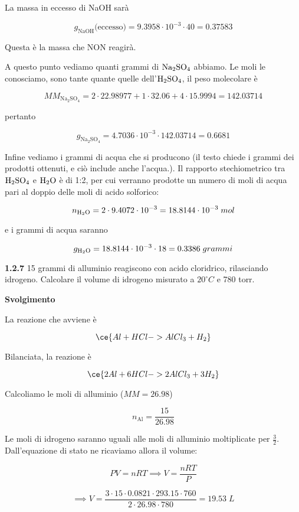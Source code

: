 La massa in eccesso di NaOH sarà

$$g_{\text{NaOH}}\text{(eccesso)}=9.3958 \cdot 10^{-3} \cdot 40=0.37583$$

Questa è la massa che NON reagirà.

A questo punto vediamo quanti grammi di $\rm Na_2SO_4$ abbiamo. Le moli le conosciamo, sono tante quante quelle dell'$\rm H_2SO_4$, il peso molecolare è

$$MM_{\text{Na}_2\text{SO}_4}=2\cdot22.98977 + 1 \cdot 32.06 + 4 \cdot 15.9994=142.03714$$

pertanto

$$g_{\text{Na}_2\text{SO}_4}
=4.7036 \cdot 10^{-3} \cdot 142.03714
=0.6681$$

Infine vediamo i grammi di acqua che si producono (il testo chiede i grammi dei prodotti ottenuti, e ciò include anche l'acqua.). Il rapporto stechiometrico tra $\rm H_2SO_4$ e $\rm H_2O$ è di 1:2, per cui verranno prodotte un numero di moli di acqua pari al doppio delle moli di acido solforico:

$$n_{\rm H_2O}= 2 \cdot 9.4072 \cdot 10^{-3}=18.8144 \cdot 10^{-3}\;mol$$

e i grammi di acqua saranno

$$g_{\rm H_2O}=18.8144 \cdot 10^{-3} \cdot 18=0.3386\;grammi$$

\textbf{1.2.7} 15 grammi di alluminio reagiscono con acido cloridrico, rilasciando idrogeno. Calcolare il volume di idrogeno misurato a $20^{\circ}C$ e 780 torr.

\vspace{0.2cm}\large\textbf{Svolgimento}\normalsize

\vspace{0.2cm}La reazione che avviene è

$$\ce{Al + HCl -> AlCl_3 + H_2}$$

Bilanciata, la reazione è

$$\ce{2Al + 6HCl -> 2AlCl_3 + 3H_2}$$

Calcoliamo le moli di alluminio ($MM=26.98$)

$$n_{\text{Al}}=\frac{15}{26.98}$$

Le moli di idrogeno saranno uguali alle moli di alluminio moltiplicate per $\frac{3}{2}$. Dall'equazione di stato ne ricaviamo allora il volume:

$$PV=nRT \implies V=\frac{nRT}{P}$$

$$\implies V=\frac{3 \cdot 15 \cdot 0.0821 \cdot 293.15 \cdot 760}{2 \cdot 26.98 \cdot 780}=19.53\;L$$

